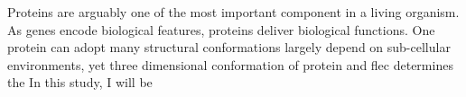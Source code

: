 Proteins are arguably one of the most important component in a living organism. As genes encode biological features, proteins deliver biological functions. One protein can adopt many structural conformations largely depend on sub-cellular environments, yet three dimensional conformation of protein and flec determines the     In this study, I will be 